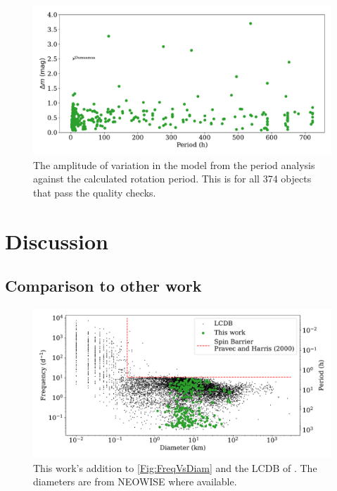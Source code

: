 \documentclass{UCreport}
\begin{document}
\begin{figure}
  \centering
  \includegraphics[width = \textwidth]{./Figures/QualPervsAmp1I.pdf}
  \caption[Amplitude of Variation against Rotation Period]{The amplitude of variation in the model from the period analysis against the calculated rotation period.
    This is for all 374 %
    objects that pass the quality checks.
  }
  \label{Fig:perVSamp}
\end{figure}


\section{Discussion}\label{Sec:Disc}

\subsection{Comparison to other work }%


\begin{figure}
  \centering
  \includegraphics[width=\textwidth]{./Figures/Diam-FreqPlotThisWork.pdf}
  \caption{This work's addition to \autoref{Fig:FreqVsDiam} and the LCDB of \citet{Warner2009}. The diameters are from NEOWISE where available.}
  \label{Fig:FreqDiamUpdate}
\end{figure}
\end{document}
